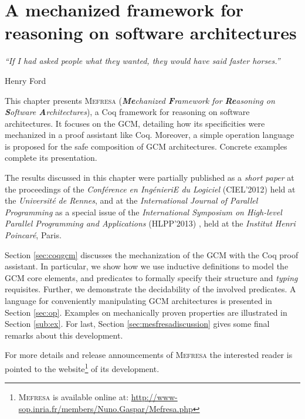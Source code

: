 \chapter{A mechanized framework for reasoning on software architectures}
\label{chap:mefresa} 
\epigraph{\textit{“If I had asked people what they wanted, they would have said faster horses.”}}{Henry Ford}
	
\minitoc

	
This chapter presents \textsc{Mefresa} (\textit{\textbf{Me}chanized \textbf{F}ramework for \textbf{Re}asoning on \textbf{S}oftware \textbf{A}rchitectures}), a Coq framework for reasoning on software architectures.
	It focuses on the \ac{GCM}, detailing how its specificities were mechanized in a proof assistant like Coq. 
	Moreover, a simple \textsf{operation} language is proposed for the safe composition of 
	\ac{GCM} architectures. Concrete examples complete its presentation.
		
	The results discussed in this chapter were partially published as a \textit{short paper} at the proceedings
	of the \textit{Conf\'erence en Ing\'enieriE du Logiciel} (CIEL'2012) \cite{gaspar:hal-00725291} held
	at the \textit{Universit\'e de Rennes},
	and at the \textit{International Journal of Parallel Programming} as a special issue
	of the \textit{International Symposium on High-level Parallel Programming and Applications} (HLPP'2013) \cite{GASHENMAD:IJPP13},
	held at the \textit{Institut Henri Poincar\'e}, Paris.	
	
	Section \ref{sec:coqgcm} discusses the mechanization of the \ac{GCM} with the Coq
	proof assistant. In particular, we show how we use inductive definitions to model
	the \ac{GCM} core elements, and predicates to formally specify their structure
	and \textit{typing} requisites.  Further, we demonstrate the decidability
	of the involved predicates.	
	A language for conveniently manipulating \ac{GCM} architectures
	is presented in Section \ref{sec:op}. Examples on mechanically proven properties
	are illustrated in Section \ref{sub:ex}.	For last, Section \ref{sec:mesfresadiscussion} gives
	some final remarks about this development.
	 
		
	For more details and release announcements of \textsc{Mefresa} 
	the interested reader is pointed to the website\footnote{\textsc{Mefresa}  is available online at: 
	\url{http://www-sop.inria.fr/members/Nuno.Gaspar/Mefresa.php}} of its development. 
